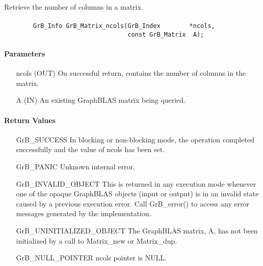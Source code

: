 Retrieve the number of columns in a matrix.

\paragraph{\syntax}

\begin{verbatim}
        GrB_Info GrB_Matrix_ncols(GrB_Index        *ncols,
                                  const GrB_Matrix  A);
\end{verbatim}

\paragraph{Parameters}

\begin{itemize}[leftmargin=1.1in]
    \item[{\sf ncols}] ({\sf OUT}) On successful return, contains the number of columns in the matrix.
    \item[{\sf A}] ({\sf IN}) An existing GraphBLAS matrix being queried.
\end{itemize}

\paragraph{Return Values}

\begin{itemize}[leftmargin=2.1in]
    \item[{\sf GrB\_SUCCESS}]   In blocking or non-blocking mode, the operation 
    completed successfully and the value of {\sf ncols} has been set.

    \item[{\sf GrB\_PANIC}]     Unknown internal error.
    
    \item[{\sf GrB\_INVALID\_OBJECT}] This is returned in any execution mode 
    whenever one of the opaque GraphBLAS objects (input or output) is in an invalid 
    state caused by a previous execution error.  Call {\sf GrB\_error()} to access 
    any error messages generated by the implementation.

    \item[{\sf GrB\_UNINITIALIZED\_OBJECT}]  The GraphBLAS matrix, {\sf A}, has 
    not been initialized by a call to {\sf Matrix\_new} or {\sf Matrix\_dup}.
    
    \item[{\sf GrB\_NULL\_POINTER}]  {\sf ncols} pointer is {\sf NULL}.
\end{itemize}

